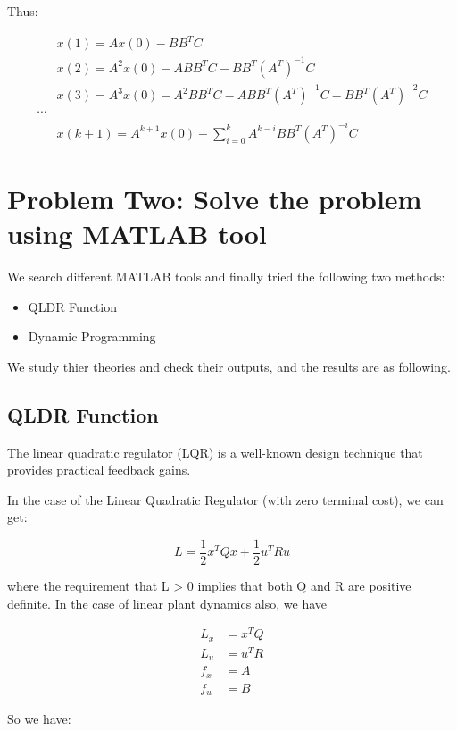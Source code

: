 \documentclass{mcmthesis}
\begin{document}
Thus:

\begin{align}
&x(1)=A x(0)-B B^{T} C \\
&x(2)=A^{2} x(0)-A B B^{T} C-B B^{T}\left(A^{T}\right)^{-1} C \\
&x(3)=A^{3} x(0)-A^{2} B B^{T} C-A B B^{T}\left(A^{T}\right)^{-1} C-B B^{T}\left(A^{T}\right)^{-2} C \\
\cdots \\
& x(k+1)=A^{k+1} x(0)-\sum_{i=0}^{k} A^{k-i} B B^{T}\left(A^{T}\right)^{-i} C
\end{align}


\section{Problem Two: Solve the problem using MATLAB tool}

We search different MATLAB tools and finally tried the following two methods:

\begin{itemize}

\item QLDR Function
\item Dynamic Programming 

\end{itemize}

We study thier theories and check their outputs, and the results are as following.
\subsection{QLDR Function}

The linear quadratic regulator (LQR) is a well-known design technique that provides practical feedback gains.

In the case of the Linear Quadratic Regulator (with zero terminal cost), we can get:

$$L=\frac{1}{2} x^{T} Q x+\frac{1}{2} u^{T} R u$$

where the requirement that L > 0 implies that both Q and R are positive definite. In the
case of linear plant dynamics also, we have


$$\begin{aligned}
L_{x} &=x^{T} Q \\
L_{u} &=u^{T} R \\
f_{x} &=A \\
f_{u} &=B
\end{aligned}$$

So we have:
\end{document}
